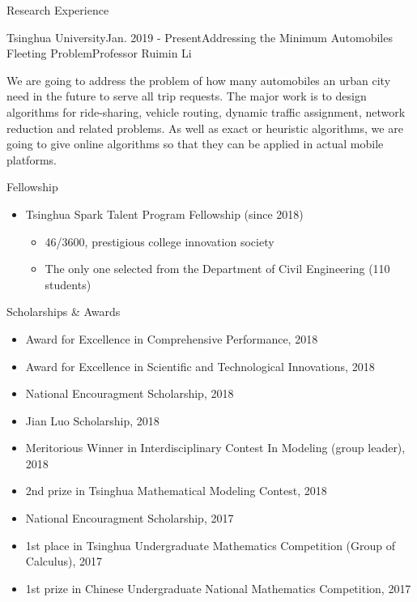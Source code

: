 \documentclass{resume} %
\begin{document}
\begin{rSection}{Research Experience}
\begin{rSubsection}{Tsinghua University}{Jan. 2019 - Present}{Addressing the Minimum Automobiles Fleeting Problem}{Professor Ruimin Li}
\item We are going to address the problem of how many automobiles an urban city need in the future to serve all trip requests. The major work is to design algorithms for ride-sharing, vehicle routing, dynamic traffic assignment, network reduction and related problems. As well as exact or heuristic algorithms, we are going to give online algorithms so that they can be applied in actual mobile platforms.
\end{rSubsection}

\end{rSection}

\begin{rSection}{Fellowship}
\begin{itemize}
\item Tsinghua Spark Talent Program Fellowship (since 2018)
	\begin{itemize}
		\item 46/3600, prestigious college innovation society
		\item The only one selected from the Department of Civil Engineering (110 students)
	\end{itemize}
\end{itemize}
\end{rSection}

\begin{rSection}{Scholarships \& Awards}
\begin{itemize}
	\item Award for Excellence in Comprehensive Performance, 2018
	\item Award for Excellence in Scientific and Technological Innovations, 2018
	\item National Encouragment Scholarship, 2018
	\item Jian Luo Scholarship, 2018
	\item Meritorious Winner in Interdisciplinary Contest In Modeling (group leader), 2018
	\item 2nd prize in Tsinghua Mathematical Modeling Contest, 2018
	\item National Encouragment Scholarship, 2017
	\item 1st place in Tsinghua Undergraduate Mathematics Competition (Group of Calculus), 2017
	\item 1st prize in Chinese Undergraduate National Mathematics Competition, 2017
\end{itemize}
\end{rSection}
\end{document}
